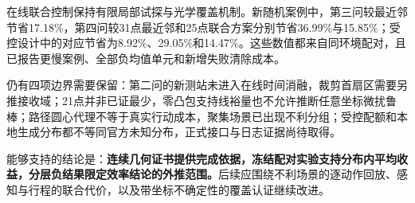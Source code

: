 \documentclass[UTF8,a4paper,zihao=-4,fontset=mac]{ctexart}
\begin{document}
在线联合控制保持有限局部试探与光学覆盖机制。新随机案例中，第三问较最近邻节省17.18\%，第四问较31点最近邻和25点联合方案分别节省36.99\%与15.85\%；受控设计中的对应节省为8.92\%、29.05\%和14.47\%。这些数值都来自同环境配对，且已报告更慢案例、全部负均值单元和新增失败清除成本。

仍有四项边界需要保留：第二问的新测站未进入在线时间消融，裁剪首扇区需要另推接收域；21点并非已证最少，零凸包支持线裕量也不允许推断任意坐标微扰鲁棒；路径圆心代理不等于真实行动成本，聚集场景已出现不利分组；受控配额和本地生成分布都不等同官方未知分布，正式接口与日志证据尚待取得。

能够支持的结论是：\textbf{连续几何证书提供完成依据，冻结配对实验支持分布内平均收益，分层负结果限定效率结论的外推范围。}后续应围绕不利场景的逐动作回放、感知与行程的联合代价，以及带坐标不确定性的覆盖认证继续改进。
\end{document}
